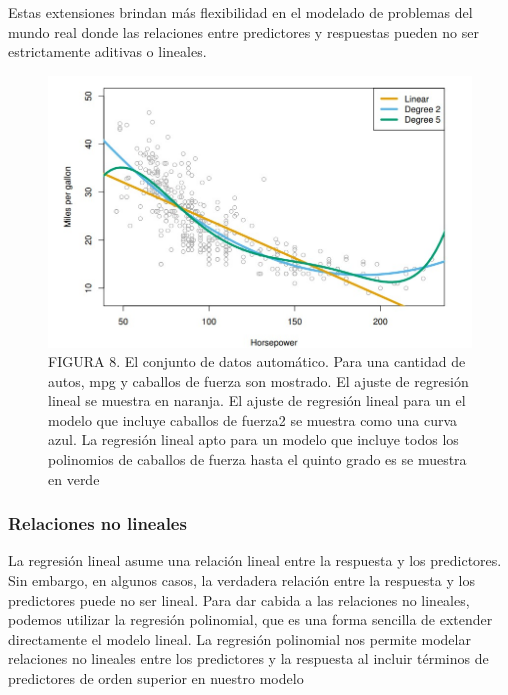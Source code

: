 \documentclass[
  letterpaper,
  DIV=11,
  numbers=noendperiod]{scrartcl}
\begin{document}
Estas extensiones brindan más flexibilidad en el modelado de problemas
del mundo real donde las relaciones entre predictores y respuestas
pueden no ser estrictamente aditivas o lineales.

\begin{figure}

{\centering \includegraphics{images/dsad.jpg}

}

\caption{FIGURA 8. El conjunto de datos automático. Para una cantidad de
autos, mpg y caballos de fuerza son mostrado. El ajuste de regresión
lineal se muestra en naranja. El ajuste de regresión lineal para un el
modelo que incluye caballos de fuerza2 se muestra como una curva azul.
La regresión lineal apto para un modelo que incluye todos los polinomios
de caballos de fuerza hasta el quinto grado es se muestra en verde}

\end{figure}

\hypertarget{relaciones-no-lineales}{%
\subsubsection{Relaciones no lineales}\label{relaciones-no-lineales}}

La regresión lineal asume una relación lineal entre la respuesta y los
predictores. Sin embargo, en algunos casos, la verdadera relación entre
la respuesta y los predictores puede no ser lineal. Para dar cabida a
las relaciones no lineales, podemos utilizar la regresión polinomial,
que es una forma sencilla de extender directamente el modelo lineal. La
regresión polinomial nos permite modelar relaciones no lineales entre
los predictores y la respuesta al incluir términos de predictores de
orden superior en nuestro modelo
\end{document}
